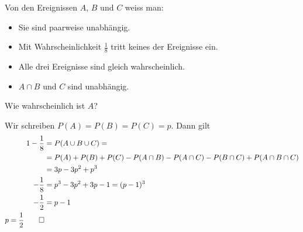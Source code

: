 Von den Ereignissen $A$, $B$ und $C$ weiss man:
\begin{itemize}
\item Sie sind paarweise unabhängig.
\item Mit Wahrscheinlichkeit $\frac18$ tritt keines der
Ereignisse ein.
\item Alle drei Ereignisse sind gleich wahrscheinlich.
\item $A\cap B$ und $C$ sind unabhängig.
\end{itemize}
Wie wahrscheinlich ist $A$?

\begin{loesung}
Wir schreiben $P(A)=P(B)=P(C)=p$. Dann gilt
\begin{align*}
1-\frac18&=
P(A\cup B\cup C)=
\\
&=P(A)+P(B)+P(C) -P(A\cap B)-P(A\cap C)-P(B\cap C)+P(A\cap B\cap C)
\\
&=3p-3p^2+p^3
\\
-\frac18&=p^3-3p^2+3p-1=(p-1)^3
\\
-\frac12&=p-1\\
p=\frac12
\qedhere
\end{align*}
\end{loesung}

